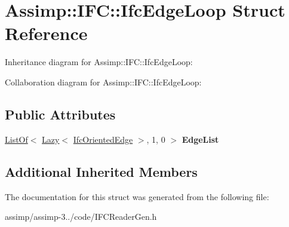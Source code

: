 \hypertarget{struct_assimp_1_1_i_f_c_1_1_ifc_edge_loop}{\section{Assimp\+:\+:I\+F\+C\+:\+:Ifc\+Edge\+Loop Struct Reference}
\label{struct_assimp_1_1_i_f_c_1_1_ifc_edge_loop}
}


Inheritance diagram for Assimp\+:\+:I\+F\+C\+:\+:Ifc\+Edge\+Loop\+:


Collaboration diagram for Assimp\+:\+:I\+F\+C\+:\+:Ifc\+Edge\+Loop\+:
\subsection*{Public Attributes}
\begin{DoxyCompactItemize}
\item 
\hypertarget{struct_assimp_1_1_i_f_c_1_1_ifc_edge_loop_a89bffe22462e092dc55cbeb4c03963da}{\hyperlink{struct_assimp_1_1_s_t_e_p_1_1_list_of}{List\+Of}$<$ \hyperlink{struct_assimp_1_1_s_t_e_p_1_1_lazy}{Lazy}$<$ \hyperlink{struct_assimp_1_1_i_f_c_1_1_ifc_oriented_edge}{Ifc\+Oriented\+Edge} $>$, 1, 0 $>$ {\bfseries Edge\+List}}\label{struct_assimp_1_1_i_f_c_1_1_ifc_edge_loop_a89bffe22462e092dc55cbeb4c03963da}

\end{DoxyCompactItemize}
\subsection*{Additional Inherited Members}


The documentation for this struct was generated from the following file\+:\begin{DoxyCompactItemize}
\item 
assimp/assimp-\/3../code/I\+F\+C\+Reader\+Gen.\+h\end{DoxyCompactItemize}

